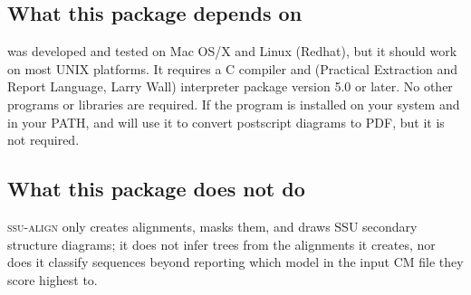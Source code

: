 \subsection{What this package depends on}
 was developed and tested on Mac OS/X and Linux
(Redhat), but it should work on most UNIX platforms. It requires a C
compiler and  (Practical Extraction and Report
Language, Larry Wall) interpreter package version 5.0 or later.  No
other programs or libraries are required. If the program 
is installed on your system and in your PATH,  and
 will use it to convert postscript diagrams to PDF, but
it is not required.

\subsection{What this package does not do}

\textsc{ssu-align} only creates alignments, masks them, and draws SSU
secondary structure diagrams; it does not infer trees from the
alignments it creates, nor does it classify sequences beyond reporting
which model in the input CM file they score highest to.


